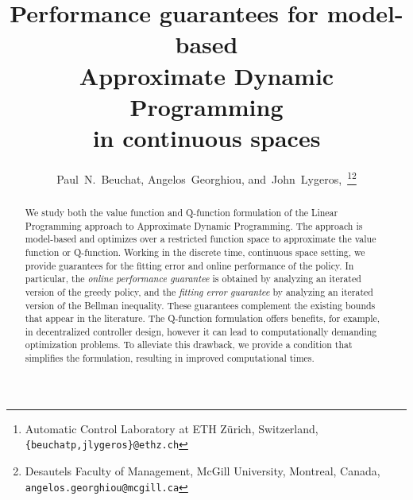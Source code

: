 \documentclass[journal]{IEEEtran}
\begin{document}
\toggletrue{doublecolumn}



\title{
Performance guarantees for model-based\\Approximate Dynamic Programming\\in continuous spaces
}





\author{Paul~N.~Beuchat,
	Angelos~Georghiou,
	and~John~Lygeros,~\thanks{
 Automatic Control Laboratory at ETH Z\"{u}rich, Switzerland, {\tt\footnotesize \{beuchatp,jlygeros\}@ethz.ch}}\thanks{
 Desautels Faculty of Management, McGill University, Montreal,
	Canada, {\tt\footnotesize angelos.georghiou@mcgill.ca}}}






















\maketitle






\begin{abstract}
We study both the value function and Q-function formulation of the Linear Programming  approach to Approximate Dynamic Programming. The approach is model-based and optimizes over a restricted function space to approximate the value function or Q-function.
Working in the discrete time, continuous space setting, we provide guarantees for the fitting error and online performance of the policy.
In particular, the \emph{online performance guarantee} is obtained by analyzing an iterated version of the greedy policy, and
the \emph{fitting error guarantee} by analyzing an iterated version of the Bellman inequality.
These guarantees complement the existing bounds that appear in the literature.
The Q-function formulation offers benefits, for example, in decentralized controller design, however it can lead to computationally demanding optimization problems.
To alleviate this drawback, we provide a condition that simplifies the formulation, resulting in improved computational times.
\end{abstract} 
\end{document}
